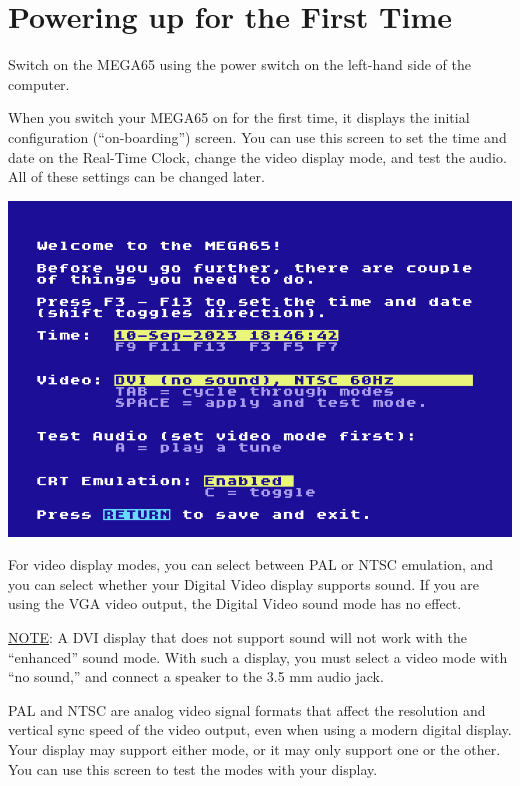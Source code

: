 \newpage

\section{Powering up for the First Time}
\label{onboarding}

Switch on the MEGA65 using the power switch on the left-hand side of the computer.

When you switch your MEGA65 on for the first time, it displays the initial configuration (``on-boarding'') screen. You can use this screen to set the time and date on the Real-Time Clock, change the video display mode, and test the audio. All of these settings can be changed later.

\begin{center}
  \includegraphics[width=0.7\linewidth]{images/img011_final_boot_01.png}
\end{center}

For video display modes, you can select between PAL or NTSC emulation, and you can select whether your Digital Video display supports sound. If you are using the VGA video output, the Digital Video sound mode has no effect.

\underline{NOTE}: A DVI display that does not support sound will not work with the ``enhanced'' sound mode. With such a display, you must select a video mode with ``no sound,'' and connect a speaker to the 3.5 mm audio jack.

PAL and NTSC are analog video signal formats that affect the resolution and vertical sync speed of the video output, even when using a modern digital display. Your display may support either mode, or it may only support one or the other. You can use this screen to test the modes with your display.

